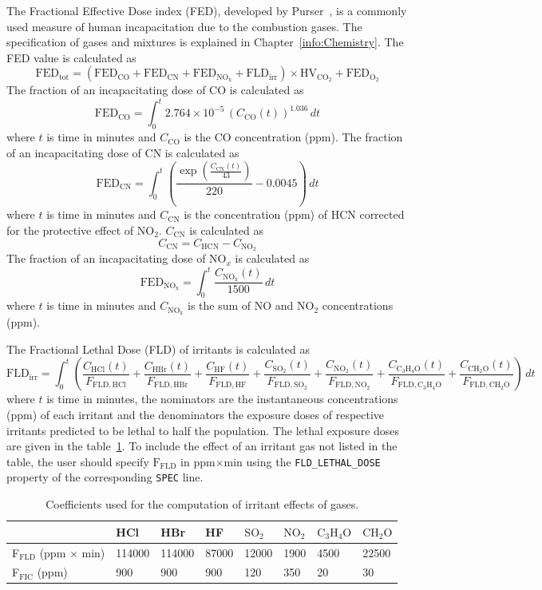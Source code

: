 \documentclass[11pt]{book}
\newcommand{\ct}{\tt\small}
\newcommand{\be}{\begin{equation}}
\newcommand{\ee}{\end{equation}}
\begin{document}
The Fractional Effective Dose index (FED), developed by Purser~\cite{SFPE:Purser}, is a commonly used measure of human incapacitation
due to the combustion gases. The specification of gases and mixtures is explained in Chapter~\ref{info:Chemistry}. The FED value is calculated as
\be
\mathrm{FED}_\mathrm{tot} = (\mathrm{FED}_\mathrm{CO} + \mathrm{FED}_\mathrm{CN} + \mathrm{FED}_\mathrm{NO_x} + \mathrm{FLD}_\mathrm{irr}) \times \mathrm{HV}_\mathrm{CO_2} + \mathrm{FED}_\mathrm{O_2}
\ee
The fraction of an incapacitating dose of CO is calculated as
\be
\mathrm{FED}_\mathrm{CO} = \int_0^t 2.764 \times 10^{-5} \, (C_\mathrm{CO}(t))^{1.036} \, dt
\ee
where $t$ is time in minutes and $C_\mathrm{CO}$ is the CO concentration (ppm). The fraction of an incapacitating dose of CN is calculated as
\be
\mathrm{FED}_\mathrm{CN} = \int_0^t \left( \frac{\exp\left( \frac{C_\mathrm{CN}(t)}{43} \right)}{220} - 0.0045 \right) \, dt
\ee
where $t$ is time in minutes and $C_\mathrm{CN}$ is the concentration (ppm) of HCN corrected for the protective effect of NO$_\mathrm{2}$. $C_\mathrm{CN}$ is calculated as
\be
C_\mathrm{CN} = C_\mathrm{HCN} - C_\mathrm{NO_2}
\ee
The fraction of an incapacitating dose of NO$_x$ is calculated as
\be
\mathrm{FED}_\mathrm{NO_x} = \int_0^t \frac{C_\mathrm{NO_x}(t)}{1500} \, dt
\ee
where $t$ is time in minutes and $C_\mathrm{NO_x}$ is the sum of NO and NO$_\mathrm{2}$ concentrations (ppm).

The Fractional Lethal Dose (FLD) of irritants is calculated as
\be
\mathrm{FLD}_\mathrm{irr} = \int_0^t \left(
    \frac{C_\mathrm{HCl}(t)}    {F_\mathrm{FLD,HCl}} +
    \frac{C_\mathrm{HBr}(t)}    {F_\mathrm{FLD,HBr}} +
    \frac{C_\mathrm{HF}(t)}     {F_\mathrm{FLD,HF}} +
    \frac{C_\mathrm{SO_2}(t)}   {F_\mathrm{FLD,SO_2}} +
    \frac{C_\mathrm{NO_2}(t)}   {F_\mathrm{FLD,NO_2}} +
    \frac{C_\mathrm{C_3H_4O}(t)}{F_\mathrm{FLD,C_3H_4O}} +
    \frac{C_\mathrm{CH_2O}(t)}  {F_\mathrm{FLD,CH_2O}}
    \right) \, dt
\ee
where $t$ is time in minutes, the nominators are the instantaneous concentrations (ppm) of each irritant and
the denominators the exposure doses of respective irritants predicted to be lethal to half the population.
The lethal exposure doses~\cite{SFPE:Purser} are given in the table~\ref{tbl:FIC}. To include the effect of an irritant gas not listed in the table,
the user should specify $\mathrm{F_{FLD}}$ in ppm$\times$min using the {\ct FLD\_LETHAL\_DOSE} property of the corresponding {\ct SPEC} line.
\begin{table}[ht]
\caption{Coefficients used for the computation of irritant effects of gases.}
\label{tbl:FIC}
\begin{center}
\begin{tabular}{|l|l|l|l|l|l|l|l|}
\hline & HCl & HBr & HF & $\mathrm{SO_2}$ & $\mathrm{NO_2}$ & $\mathrm{C_3H_4O}$ & $\mathrm{CH_2O}$  \\ \hline \hline
F${}_\mathrm{FLD}$ (ppm $\times$ min) & 114000 & 114000 & 87000 & 12000 & 1900 & 4500 & 22500 \\
F${}_\mathrm{FIC}$ (ppm) & 900 & 900 & 900 & 120 & 350 & 20 & 30 \\ \hline
\end{tabular}
\end{center}
\end{table}
\end{document}
